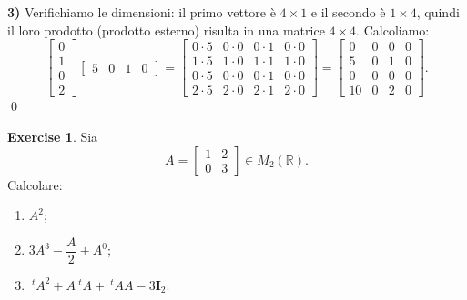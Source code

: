 \documentclass{article}
\theoremstyle{plain}
\theoremstyle{definition}
\newtheorem{xca}[exmp]{Exercise}
\theoremstyle{remark}
\begin{document}
\medskip
\textbf{3)}
Verifichiamo le dimensioni: il primo vettore è $4\times1$ e il secondo è $1\times4$, quindi il loro prodotto (prodotto esterno) risulta in una matrice $4\times4$. Calcoliamo:
\[
\begin{bmatrix}
0\\[2mm]
1\\[2mm]
0\\[2mm]
2
\end{bmatrix}
\begin{bmatrix}
5 & 0 & 1 & 0
\end{bmatrix}
=
\begin{bmatrix}
0\cdot5 & 0\cdot0 & 0\cdot1 & 0\cdot0 \\[4mm]
1\cdot5 & 1\cdot0 & 1\cdot1 & 1\cdot0 \\[4mm]
0\cdot5 & 0\cdot0 & 0\cdot1 & 0\cdot0 \\[4mm]
2\cdot5 & 2\cdot0 & 2\cdot1 & 2\cdot0
\end{bmatrix}
=
\begin{bmatrix}
0 & 0 & 0 & 0 \\[4mm]
5 & 0 & 1 & 0 \\[4mm]
0 & 0 & 0 & 0 \\[4mm]
10 & 0 & 2 & 0
\end{bmatrix}.
\]
\qed

\vspace{10pt}

\begin{bxthm}
\begin{xca}
    Sia \[
    A=\begin{bmatrix}
        1 & 2 \\
        0 & 3
    \end{bmatrix} \in M_2(\mathbb{R}).
    \]
    Calcolare:
    \begin{enumerate}
        \item \(A^2\);
        \item \(3A^3-\dfrac{A}{2}+A^0\);
        \item \(\ {}^{t}A^2+A\ {}^{t}A+\ {}^{t}AA-3\mathbf{I}_2\).
    \end{enumerate}
\end{xca}
\end{bxthm}
\end{document}
